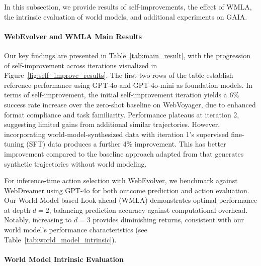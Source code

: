 \documentclass[11pt]{article}
\begin{document}
In this subsection, we provide results of self-improvements, the effect of WMLA, the intrinsic evaluation of world models, and additional experiments on GAIA.

\paragraph{WebEvolver and WMLA Main Results}

Our key findings are presented in Table~\ref{tab:main_result}, with the progression of self-improvement across iterations visualized in Figure~\ref{fig:self_improve_results}. 
The first two rows of the table establish reference performance using GPT-4o and GPT-4o-mini as foundation models.
In terms of self-improvement,
the initial self-improvement iteration yields a 6\% success rate increase over the zero-shot baseline on WebVoyager, due to enhanced format compliance and task familiarity.
Performance plateaus at iteration 2, suggesting limited gains from additional similar trajectories. 
However, incorporating world-model-synthesized data with iteration 1's supervised fine-tuning (SFT) data produces a further 4\% improvement. 
This has better improvement compared to the baseline approach adapted from \citet{LLM_agent_can_self_improve} that generates synthetic trajectories without world modeling.

For inference-time action selection with WebEvolver, we benchmark against WebDreamer using GPT-4o for both outcome prediction and action evaluation. Our World Model-based Look-ahead (WMLA) demonstrates optimal performance at depth $d=2$, balancing prediction accuracy against computational overhead. Notably, increasing to $d=3$ provides diminishing returns, consistent with our world model's performance characteristics (see Table~\ref{tab:world_model_intrinsic}).

\paragraph{World Model Intrinsic Evaluation}\label{sec:wm_intrinsic_eval}
\end{document}
